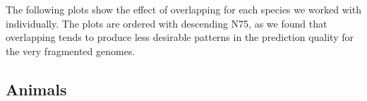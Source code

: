 \documentclass{article}
\begin{document}
The following plots show the effect of overlapping for each species we worked with individually. The plots are ordered with descending N75, as we found that overlapping tends to produce less desirable patterns in the prediction quality for the very fragmented genomes. 

\subsection{Animals}
\newpage

\end{document}
